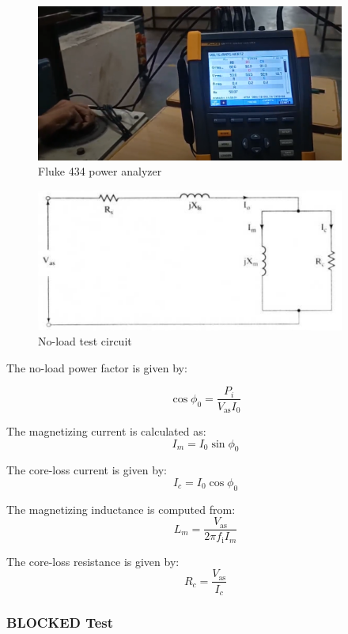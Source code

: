 
\begin{figure}[H]
	\centering
	\includegraphics[width=4in]{sections/section5/images/ParamEstim/FlukeVoltAmpHertz.png}
	\caption{Fluke 434 power analyzer}
	\label{fig:fluke434}
\end{figure}


\begin{figure}[H]
	\centering
	\includegraphics[width=4in]{sections/section5/images/ParamEstim/noloadCircuitKrish.png}
	\caption{No-load test circuit}
	\label{fig:no_load_test}
\end{figure}

The no-load power factor is given by:

$$\cos \phi_0 = \frac{P_i}{V_\text{as}I_0}$$

The magnetizing current is calculated as:
$$I_m = I_0 \sin \phi_0$$

The core-loss current is given by:
$$I_c = I_0 \cos \phi_0$$

The magnetizing inductance is computed from:
$$L_m = \frac{V_\text{as}}{2\pi f_\text{i}I_m}$$

The core-loss resistance is given by:
$$R_c = \frac{V_\text{as}}{I_c}$$


\subsubsection{BLOCKED Test}

